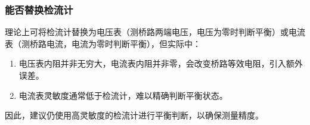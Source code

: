 \documentclass[]{../template/Report}%
\begin{document}
\begin{fullreportonly}
\subsubsection{能否替换检流计}
理论上可将检流计替换为电压表（测桥路两端电压，电压为零时判断平衡）或电流表（测桥路电流，电流为零时判断平衡），但实际中：
\begin{enumerate}
   \item 电压表内阻并非无穷大，电流表内阻并非零，会改变桥路等效电阻，引入额外误差。
   \item 电流表灵敏度通常低于检流计，难以精确判断平衡状态。
\end{enumerate}
因此，建议仍使用高灵敏度的检流计进行平衡判断，以确保测量精度。

\end{fullreportonly}
\insertnotes
\end{document}

